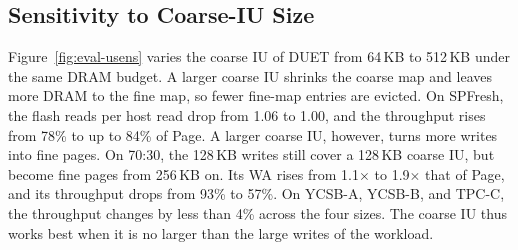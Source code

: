 \subsection{Sensitivity to Coarse-IU Size}
Figure~\ref{fig:eval-usens} varies the coarse IU of DUET from 64\,KB to 512\,KB under
the same DRAM budget. A larger coarse IU shrinks the coarse map and leaves more
DRAM to the fine map, so fewer fine-map entries are evicted. On SPFresh, the flash reads
per host read drop from 1.06 to 1.00, and the throughput rises from 78\% to up to
84\% of Page. A larger coarse IU, however, turns more writes into fine pages. On
70:30, the 128\,KB writes still cover a 128\,KB coarse IU, but
become fine pages from 256\,KB on. Its WA rises from 1.1$\times$ to
1.9$\times$ that of Page, and its throughput drops from 93\% to 57\%. On YCSB-A,
YCSB-B, and TPC-C, the throughput changes by less than 4\% across the four sizes.
The coarse IU thus works best when it is no larger than the large writes of the workload.
